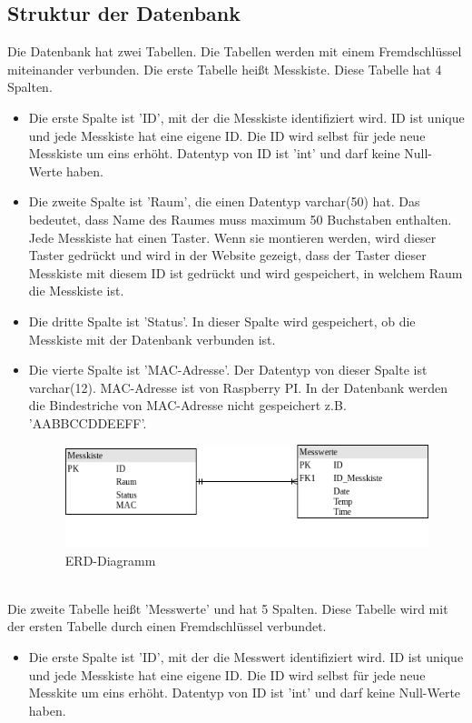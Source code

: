	\subsection{Struktur der Datenbank}
	Die Datenbank hat zwei Tabellen. Die Tabellen werden mit einem Fremdschl\"ussel miteinander verbunden. Die erste Tabelle hei{\ss}t Messkiste. Diese Tabelle hat 4 Spalten. 
	\begin{itemize}
		\item Die erste Spalte ist 'ID', mit der die Messkiste identifiziert wird. ID ist unique und jede Messkiste hat eine eigene ID. Die ID wird selbst f\"ur jede neue Messkiste um eins erh\"oht. Datentyp von ID ist 'int' und darf keine Null-Werte haben. 
		\item Die zweite Spalte ist 'Raum', die einen Datentyp varchar(50) hat. Das bedeutet, dass Name des Raumes muss maximum 50 Buchstaben enthalten. Jede Messkiste hat einen Taster. Wenn sie montieren werden, wird dieser Taster gedr\"uckt und wird in der Website gezeigt, dass der Taster dieser Messkiste mit diesem ID ist gedr\"uckt und wird gespeichert, in welchem Raum die Messkiste ist.
		\item Die dritte Spalte ist 'Status'. In dieser Spalte wird gespeichert, ob die Messkiste mit der Datenbank verbunden ist. 
		\item Die vierte Spalte ist 'MAC-Adresse'. Der Datentyp von dieser Spalte ist varchar(12). MAC-Adresse ist von Raspberry PI. In der Datenbank werden die Bindestriche von MAC-Adresse nicht gespeichert z.B. 'AABBCCDDEEFF'.
		\begin{figure}
			\centering
			\label{fi:ERD}
			\includegraphics[scale=0.7]{./bilder/db.png}
			\caption{ERD-Diagramm}
		\end{figure} 
		
		\end{itemize}
	\\
	Die zweite Tabelle hei{\ss}t 'Messwerte' und hat 5 Spalten. Diese Tabelle wird mit der ersten Tabelle durch einen Fremdschl\"ussel verbundet.
	\begin{itemize}
		\item Die erste Spalte ist 'ID', mit der die Messwert identifiziert wird. ID ist unique und jede Messkiste hat eine eigene ID. Die ID wird selbst f\"ur jede neue Messkite um eins erh\"oht. Datentyp von ID ist 'int' und darf keine Null-Werte haben. 
	\end{itemize}